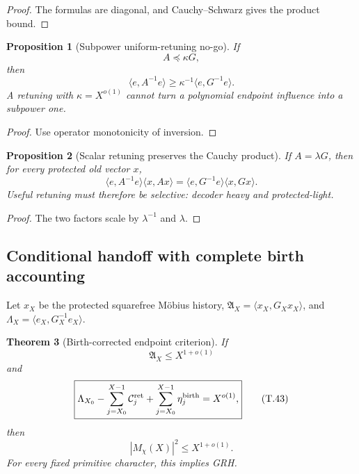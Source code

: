 \documentclass[11pt]{article}
\newtheorem{theorem}{Theorem}[section]
\newtheorem{proposition}[theorem]{Proposition}
\theoremstyle{definition}
\theoremstyle{remark}
\begin{document}
\begin{proof}
The formulas are diagonal, and Cauchy--Schwarz gives the product bound.
\end{proof}

\begin{proposition}[Subpower uniform-retuning no-go]
\label{prop:birth-uniform-retuning}
If
\[
 \boxed{A\preceq\kappa G,}
 \tag{T.35}
\]
then
\[
 \boxed{
 \langle e,A^{-1}e\rangle
 \ge\kappa^{-1}\langle e,G^{-1}e\rangle.}
 \tag{T.36}
\]
A retuning with \(\kappa=X^{o(1)}\) cannot turn a polynomial endpoint
influence into a subpower one.
\end{proposition}

\begin{proof}
Use operator monotonicity of inversion.
\end{proof}

\begin{proposition}[Scalar retuning preserves the Cauchy product]
\label{prop:birth-scalar-retuning}
If \(A=\lambda G\), then for every protected old vector \(x\),
\[
 \boxed{
 \langle e,A^{-1}e\rangle\langle x,Ax\rangle
 =\langle e,G^{-1}e\rangle\langle x,Gx\rangle.}
 \tag{T.37}
\]
Useful retuning must therefore be selective: decoder heavy and protected-light.
\end{proposition}

\begin{proof}
The two factors scale by \(\lambda^{-1}\) and \(\lambda\).
\end{proof}

\subsection{Conditional handoff with complete birth accounting}
\label{subsec:birth-handoff}

Let \(x_X\) be the protected squarefree M\"obius history,
\(\mathfrak A_X=\langle x_X,G_Xx_X\rangle\), and
\(\Lambda_X=\langle e_X,G_X^{-1}e_X\rangle\).

\begin{theorem}[Birth-corrected endpoint criterion]
\label{thm:birth-GRH}
If
\[
 \boxed{\mathfrak A_X\le X^{1+o(1)}}
 \tag{T.42}
\]
and
\[
 \boxed{
 \Lambda_{X_0}
 -\sum_{j=X_0}^{X-1}\mathcal C_j^{\rm ret}
 +\sum_{j=X_0}^{X-1}\eta_j^{\rm birth}
 =X^{o(1)},}
 \tag{T.43}
\]
then
\[
 \boxed{|M_\chi(X)|^2\le X^{1+o(1)}.}
 \tag{T.44}
\]
For every fixed primitive character, this implies GRH.
\end{theorem}
\end{document}
